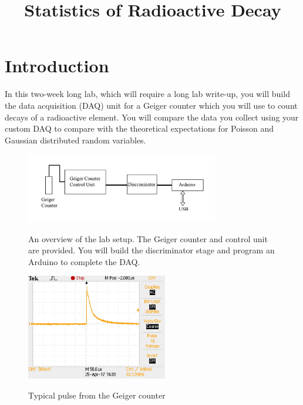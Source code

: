 \documentclass[12pt]{article}
\begin{document}


\title{Statistics of Radioactive Decay}
\maketitle


\section{Introduction}

In this two-week long lab, which will require a long lab write-up, you
will build the data acquisition (DAQ) unit for a Geiger counter which
you will use to count decays of a radioactive element.  You will
compare the data you collect using your custom DAQ to compare with the
theoretical expectations for Poisson and Gaussian distributed random
variables.

\begin{figure}[htbp]
\begin{center}
{\includegraphics[width=0.75\textwidth]{figs/plan.pdf}}
\end{center}
\caption{\label{fig:plan} An overview of the lab setup.  The Geiger
  counter and control unit are provided.  You will build the
  discriminator stage and program an Arduino to complete the DAQ.}
\end{figure}


\begin{figure}[htbp]
\begin{center}
{\includegraphics[width=0.55\textwidth]{figs/geiger_pulse.jpg}}
\end{center}
\caption{\label{fig:geigerpulse} Typical pulse from the Geiger counter}
\end{figure}
\end{document}
